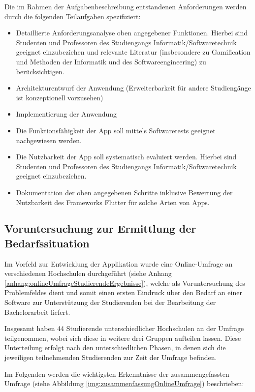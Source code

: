\documentclass[bibliography=totoc,listof=totoc,BCOR=5mm,DIV=12,oneside]{scrbook}
\begin{document}
\par Die im Rahmen der Aufgabenbeschreibung entstandenen Anforderungen werden durch die folgenden Teilaufgaben spezifiziert:
\begin{itemize}
\item Detaillierte Anforderungsanalyse oben angegebener Funktionen. Hierbei sind Studenten und Professoren des Studiengangs Informatik/Softwaretechnik geeignet einzubeziehen und relevante Literatur (insbesondere zu Gamification und Methoden der Informatik und des Softwareengineering) zu berücksichtigen.
\item Architekturentwurf der Anwendung (Erweiterbarkeit für andere Studiengänge ist konzeptionell vorzusehen)
\item Implementierung der Anwendung
\item Die Funktionsfähigkeit der App soll mittels Softwaretests geeignet nachgewiesen werden.
\item Die Nutzbarkeit der App soll systematisch evaluiert werden. Hierbei sind Studenten und Professoren des Studiengangs Informatik/Softwaretechnik geeignet einzubeziehen.
\item Dokumentation der oben angegebenen Schritte inklusive Bewertung der Nutzbarkeit des Frameworks Flutter für solche Arten von Apps.
\end{itemize}

\newpage
\subsection{Voruntersuchung zur Ermittlung der Bedarfssituation}
\par \bigskip Im Vorfeld zur Entwicklung der Applikation wurde eine Online-Umfrage an verschiedenen Hochschulen durchgeführt (siehe Anhang \ref{anhang:onlineUmfrageStudierendeErgebnisse}), welche als Voruntersuchung des Problemfeldes dient und somit einen ersten Eindruck über den Bedarf an einer Software zur Unterstützung der Studierenden bei der Bearbeitung der Bachelorarbeit liefert.

\par \bigskip Insgesamt haben 44 Studierende unterschiedlicher Hochschulen an der Umfrage teilgenommen, wobei sich diese in weitere drei Gruppen aufteilen lassen. Diese Unterteilung erfolgt nach den unterschiedlichen Phasen, in denen sich die jeweiligen teilnehmenden Studierenden zur Zeit der Umfrage befinden. 

\par \bigskip Im Folgenden werden die wichtigsten Erkenntnisse der zusammengefassten Umfrage (siehe Abbildung \ref{img:zusammenfassungOnlineUmfrage}) beschrieben:
\end{document}
